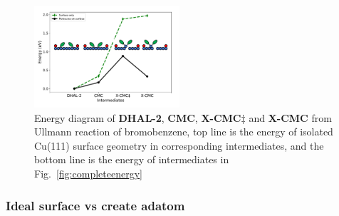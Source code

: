 \documentclass[%
 reprint,
 amsmath,amssymb,
 aps,
prb,
floatfix,
]{revtex4-2}
\begin{document}


\begin{figure}[hbt]
\centering
\includegraphics[width=0.48\textwidth]{Fig/onlysurface.pdf}
\caption{Energy diagram of \textbf{DHAL-2}, \textbf{CMC}, \textbf{X-CMC$\ddagger$} and \textbf{X-CMC} from Ullmann reaction of bromobenzene, top line is the energy of isolated Cu(111) surface geometry in corresponding intermediates, and the bottom line is the energy of intermediates in Fig.~\ref{fig:completeenergy}}
\label{fig:onlysurface}
\end{figure}



\subsubsection{Ideal surface vs create adatom}
\end{document}
